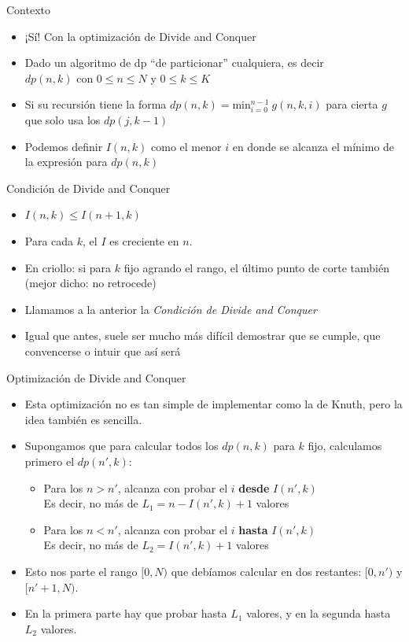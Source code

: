 \documentclass{beamer}
\begin{document}
\begin{frame}{Contexto}
    \begin{itemize}
		\item ¡Sí! Con la optimización de Divide and Conquer
		\item Dado un algoritmo de dp ``de particionar'' cualquiera, es decir \\ $dp(n,k)$ con $0 \leq n \leq N$ y $0 \leq k \leq K$
		\item Si su recursión tiene la forma $dp(n,k) = \mbox{min}_{i=0}^{n-1}{\ g(n,k,i)}$ para cierta $g$ que solo usa los $dp(j,k-1)$ 
		\item Podemos definir $I(n,k)$ como el menor $i$ en donde se alcanza el mínimo de la expresión para $dp(n,k)$
    \end{itemize}
\end{frame}

\begin{frame}{Condición de Divide and Conquer}
    \begin{itemize}
		\item $I(n,k) \leq I(n+1,k)$
		\item Para cada $k$, el $I$ es creciente en $n$.
		\item En criollo: si para $k$ fijo agrando el rango, el último punto de corte también (mejor dicho: no retrocede) 
		\item Llamamos a la anterior la \textit{Condición de Divide and Conquer}
		\item Igual que antes, suele ser mucho más difícil demostrar que se cumple, que convencerse o intuir que así será
    \end{itemize}
\end{frame}

\begin{frame}{Optimización de Divide and Conquer}
    \begin{itemize}
		\item Esta optimización no es tan simple de implementar como la de Knuth, pero la idea también es sencilla.
		\item Supongamos que para calcular todos los $dp(n,k)$ para $k$ fijo, calculamos primero el $dp(n',k)$:
			\begin{itemize}
				\item Para los $n > n'$, alcanza con probar el $i$ \textbf{desde} $I(n',k)$ \\
						Es decir, no más de $L_1 = n - I(n',k) + 1$ valores
				\item Para los $n < n'$, alcanza con probar el $i$ \textbf{hasta} $I(n',k)$ \\
				        Es decir, no más de $L_2 = I(n',k) + 1$ valores
			\end{itemize}
		\item Esto nos parte el rango $[0,N)$ que debíamos calcular en dos restantes: $[0,n')$ y $[n'+1,N)$.
		\item En la primera parte hay que probar hasta $L_1$ valores, y en la segunda hasta $L_2$ valores.
    \end{itemize}
\end{frame}
\end{document}
